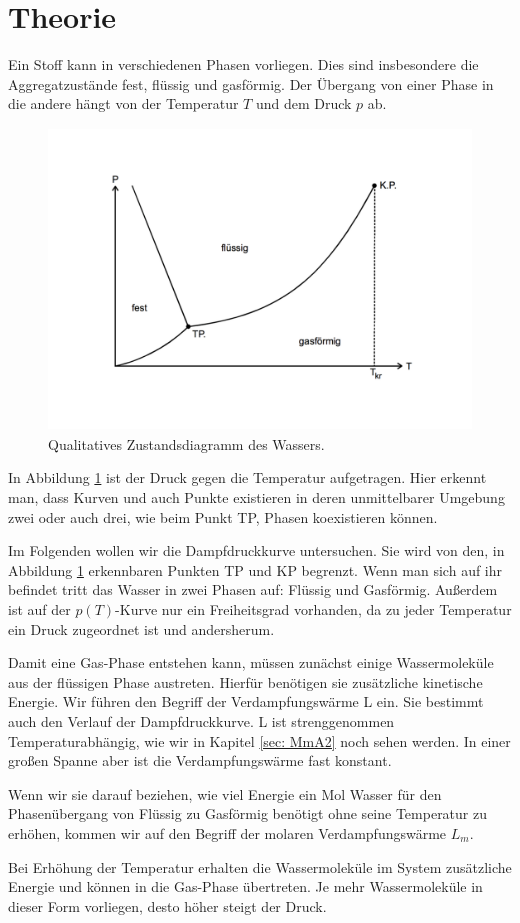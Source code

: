 \section{Theorie}
\label{sec:Theorie}

Ein Stoff kann in verschiedenen Phasen vorliegen. Dies sind insbesondere die Aggregatzustände fest, flüssig und gasförmig.
Der Übergang von einer Phase in die andere hängt von der Temperatur $T$ und dem Druck $p$ ab.

\begin{figure}
  \centering
  \includegraphics[height = 8cm]{Phasendiagramm.pdf}
  \caption{Qualitatives Zustandsdiagramm des Wassers.}
  \label{fig: Wasserdiagramm}
\end{figure}

In Abbildung \ref{fig: Wasserdiagramm} ist der Druck gegen die Temperatur aufgetragen.
Hier erkennt man, dass Kurven und auch Punkte existieren in deren unmittelbarer Umgebung zwei oder auch drei, wie beim Punkt TP, Phasen koexistieren können.

Im Folgenden wollen wir die Dampfdruckkurve untersuchen. Sie wird von den, in Abbildung \ref{fig: Wasserdiagramm} erkennbaren Punkten TP und KP
begrenzt. Wenn man sich auf ihr befindet tritt das Wasser in zwei Phasen auf: Flüssig und Gasförmig. Außerdem ist auf der $p(T)$-Kurve nur ein Freiheitsgrad
vorhanden, da zu jeder Temperatur ein Druck zugeordnet ist und andersherum.

Damit eine Gas-Phase entstehen kann, müssen zunächst einige Wassermoleküle aus der flüssigen Phase austreten. Hierfür benötigen sie zusätzliche
kinetische Energie. Wir führen den Begriff der Verdampfungswärme L ein. Sie bestimmt auch den Verlauf der Dampfdruckkurve. L ist
strenggenommen Temperaturabhängig, wie wir in Kapitel \ref{sec: MmA2} noch sehen werden. In einer großen Spanne aber ist die Verdampfungswärme
fast konstant.

Wenn wir sie darauf beziehen, wie viel Energie ein Mol Wasser für den Phasenübergang von Flüssig zu Gasförmig benötigt ohne seine Temperatur zu
erhöhen, kommen wir auf den Begriff der molaren Verdampfungswärme $L_{m}$.

Bei Erhöhung der Temperatur erhalten die Wassermoleküle im System zusätzliche Energie und können in die Gas-Phase übertreten. Je mehr Wassermoleküle
in dieser Form vorliegen, desto höher steigt der Druck.
\newpage

